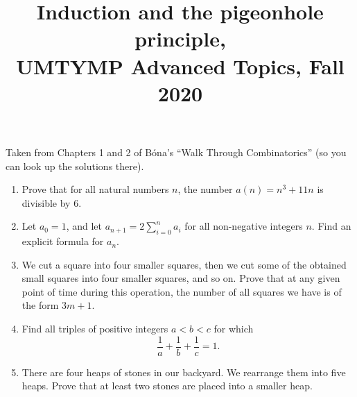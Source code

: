 \documentclass[11pt]{article}
\title{Induction and the pigeonhole principle, \\UMTYMP Advanced Topics, Fall 2020}
\date{}
\begin{document}
\maketitle

\thispagestyle{empty}

Taken from Chapters 1 and 2 of B\'{o}na's ``Walk Through Combinatorics'' (so you can look up the solutions there).

\medskip

\begin{enumerate}

\item Prove that for all natural numbers $n$, the number $a(n) = n^3 + 11n$ is divisible by $6$.
\item Let $a_0 = 1$, and let $a_{n+1} = 2 \sum_{i=0}^{n} a_i$ for all non-negative integers $n$. Find an explicit formula for $a_n$.
\item We cut a square into four smaller squares, then we cut some of the obtained small squares into four smaller squares, and so on. Prove that at any given point of time during this operation, the number of all squares we have is of the form $3m+1$.

\medskip

\medskip

\item Find all triples of positive integers $a < b < c$ for which \[\frac{1}{a}+\frac{1}{b}+\frac{1}{c}=1.\]

\item There are four heaps of stones in our backyard. We rearrange them into five heaps. Prove that at least two stones are placed into a smaller heap.

\end{enumerate}
\end{document}
